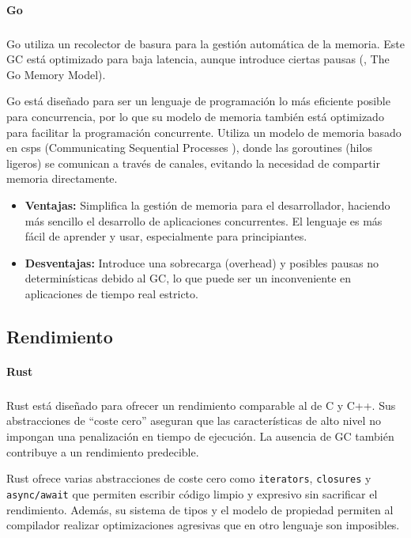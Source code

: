 \paragraph{Go}
\subparagraph{}

Go utiliza un recolector de basura para la gestión automática de la memoria. Este GC está optimizado para baja latencia, aunque introduce ciertas pausas (\cite{go-documentation}, The Go Memory Model).

Go está diseñado para ser un lenguaje de programación lo más eficiente posible para concurrencia, por lo que su modelo de memoria también está optimizado para facilitar la programación concurrente. Utiliza un modelo de memoria basado en \glspl{csp} (Communicating Sequential Processes \cite{communicating-sequential-processes}), donde las goroutines (hilos ligeros) se comunican a través de canales, evitando la necesidad de compartir memoria directamente.
\begin{itemize}
    \item \textbf{Ventajas:} Simplifica la gestión de memoria para el desarrollador, haciendo más sencillo el desarrollo de aplicaciones concurrentes. El lenguaje es más fácil de aprender y usar, especialmente para principiantes.
    \item \textbf{Desventajas:} Introduce una sobrecarga (overhead) y posibles pausas no determinísticas debido al GC, lo que puede ser un inconveniente en aplicaciones de tiempo real estricto.
\end{itemize}

\subsection{Rendimiento}
\paragraph{Rust}
\subparagraph{}
Rust está diseñado para ofrecer un rendimiento comparable al de C y C++. Sus abstracciones de ``coste cero'' aseguran que las características de alto nivel no impongan una penalización en tiempo de ejecución. La ausencia de GC también contribuye a un rendimiento predecible.

Rust ofrece varias abstracciones de coste cero como \texttt{iterators}, \texttt{closures} y \texttt{async/await} que permiten escribir código limpio y expresivo sin sacrificar el rendimiento. Además, su sistema de tipos y el modelo de propiedad permiten al compilador realizar optimizaciones agresivas que en otro lenguaje son imposibles.

